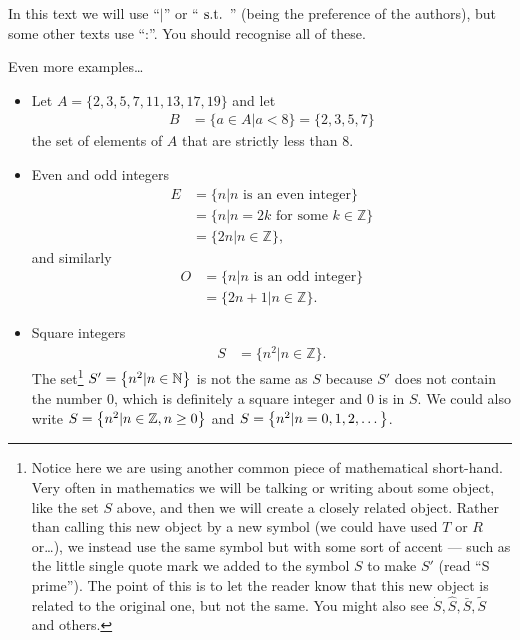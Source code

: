In this text we will use ``$|$'' or ``${\mbox{ s.t. }}$'' (being the preference of the
authors), but some other texts use ``:''. You should recognise all of these.
\begin{eg}
  Even more examples\dots
\begin{itemize}
 \item Let $A = \{2,3,5,7,11,13,17,19\}$ and let
 \begin{align*}
  B &= \{ a \in A | a<8\} = \{2,3,5,7\}
  \end{align*}
  the set of elements of $A$ that are strictly less than 8.

\item Even and odd integers
\begin{align*}
E &= \{ n | n \mbox{ is an even integer} \} \\
 &= \{n | n =2k \mbox{ for some $k \in \mathbb{Z}$} \} \\
 &= \{2n | n \in \mathbb{Z}\},
\end{align*}
and similarly
\begin{align*}
  O &= \{ n | n \mbox{ is an odd integer} \} \\
  &= \{2n+1 | n \in \mathbb{Z}\}.
\end{align*}

\item Square integers
\begin{align*}
  S &= \{n^2 | n \in \mathbb{Z}\}.
\end{align*}
The set\footnote{Notice here we are using another common piece of mathematical
short-hand. Very often in mathematics we will be talking or writing about some
object, like the set $S$ above, and then we will create a closely related
object. Rather than calling this new object by a new symbol (we could have used
$T$ or $R$ or\dots), we instead use the same symbol but with some sort of accent
--- such as the little single quote mark we added to the symbol $S$ to make
$S'$ (read ``S prime''). The point of this is to let the reader know that this
new object is related to the original one, but not the same. You might also see
$\dot{S}, \hat{S}, \bar{S}, \tilde{S}$ and others.} $S'= \left\{n^2 | n \in
\mathbb{N}\right\}$ is not the same as $S$ because $S'$ does not contain the number
$0$, which is definitely a square integer and $0$ is in $S$. We could also write
$S = \left\{n^2 | n \in \mathbb{Z}, n \geq 0\right\}$ and $S=\left\{n^2 | n=0,1,2,\dots\right\}$.
\end{itemize}
\end{eg}



